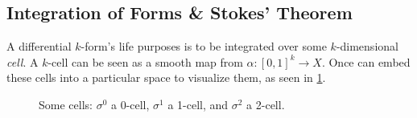 \documentclass{article}
\begin{document}
        \subsection{Integration of Forms \& Stokes' Theorem}
        A differential $k$-form's life purposes is to be integrated over some $k$-dimensional \emph{cell}. A $k$-cell can be seen as a smooth map from $\alpha: [0,1]^k \to X$. Once can embed these cells into a particular space to visualize them, as seen in \cref{fig:cells}.
        \begin{figure}
            \centering
            
            \caption{Some cells: $\sigma^0$ a 0-cell, $\sigma^1$ a 1-cell, and $\sigma^2$ a 2-cell.}
            \label{fig:cells}
        \end{figure}
		
		
\end{document}
